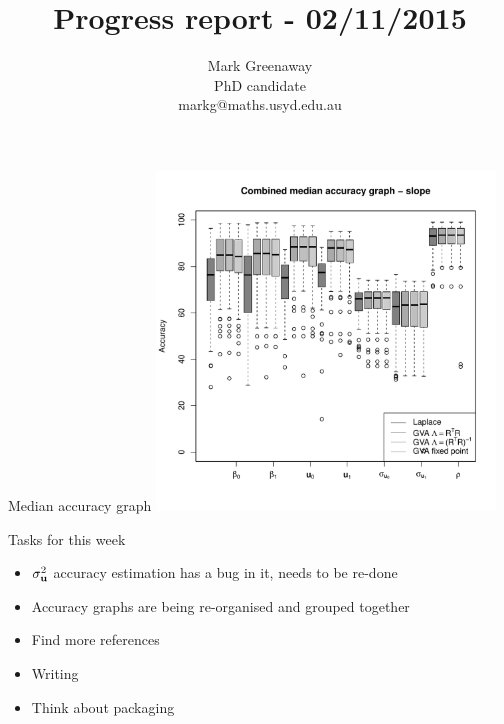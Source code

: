 \documentclass{beamer}
\title{Progress report - 02/11/2015}
\author{Mark Greenaway\\PhD candidate\\markg@maths.usyd.edu.au}
\begin{document}
\begin{frame}
\maketitle
\end{frame}

\begin{frame}{Median accuracy graph}
\includegraphics[width=90mm, height=90mm]{code/results/median_accuracy_combined_slope.pdf}
\end{frame}

\begin{frame}{Tasks for this week}
\begin{itemize}
\item $\sigma_{\bf u}^2$ accuracy estimation has a bug in it, needs to be re-done
\item Accuracy graphs are being re-organised and grouped together
\item Find more references
\item Writing
\item Think about packaging
\end{itemize}
\end{frame}
\end{document}
